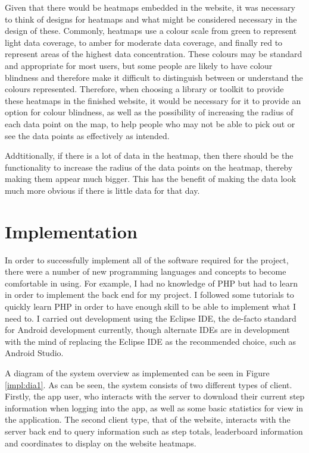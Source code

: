 \documentclass{l4proj}
\begin{document}
Given that there would be heatmaps embedded in the website, it was necessary to think of designs for heatmaps and what might be considered necessary in the design of these. Commonly, heatmaps use a colour scale from green to represent light data coverage, to amber for moderate data coverage, and finally red to represent areas of the highest data concentration. These colours may be standard and appropriate for most users, but some people are likely to have colour blindness and therefore make it difficult to distinguish between or understand the colours represented. Therefore, when choosing a library or toolkit to provide these heatmaps in the finished website, it would be necessary for it to provide an option for colour blindness, as well as the possibility of increasing the radius of each data point on the map, to help people who may not be able to pick out or see the data points as effectively as intended. 

Addtitionally, if there is a lot of data in the heatmap, then there should be the functionality to increase the radius of the data points on the heatmap, thereby making them appear much bigger. This has the benefit of making the data look much more obvious if there is little data for that day. 


\chapter{Implementation}

In order to successfully implement all of the software required for the project, there were a number of new programming languages and concepts to become comfortable in using. For example, I had no knowledge of PHP but had to learn in order to implement the back end for my project. I followed some tutorials to quickly learn PHP in order to have enough skill to be able to implement what I need to. I carried out development using the Eclipse IDE, the de-facto standard for Android development currently, though alternate IDEs are in development with the mind of replacing the Eclipse IDE as the recommended choice, such as Android Studio.

A diagram of the system overview as implemented can be seen in Figure \ref{impl:dia1}. As can be seen, the system consists of two different types of client. Firstly, the app user, who interacts with the server to download their current step information when logging into the app, as well as some basic statistics for view in the application. The second client type, that of the website, interacts with the server back end to query information such as step totals, leaderboard information and coordinates to display on the website heatmaps.
\end{document}
